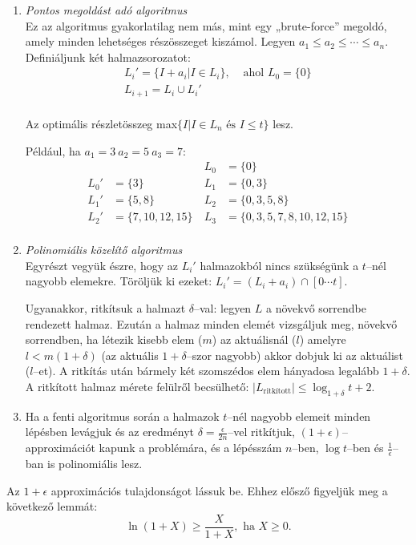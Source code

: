 \begin{enumerate}
  \item \emph{Pontos megoldást adó algoritmus}\\
Ez az algoritmus gyakorlatilag nem más, mint egy „brute-force” megoldó, amely
minden lehetséges részösszeget kiszámol. Legyen $a_1 \leq a_2 \leq \cdots \leq
a_n$. Definiáljunk két halmazsorozatot:
\begin{align*}
L_i' = \{ I + a_i | I \in L_i\}, & \mbox{ ahol } L_0 = \{ 0\} \\
L_{i+1}=L_i \cup L_i' & \\
\end{align*} 

Az optimális részletösszeg max$\{I|I \in L_n \mbox{ és } I \leq t\}$ lesz.

Például, ha $a_1=3~a_2=5~a_3=7$:
{ 
\begin{align*}
    &&~L_0 &= \{ 0 \} \\
L_0'&= \{ 3 \} &~ L_1 &= \{ 0, 3\} \\
L_1'&= \{ 5,8 \} &~ L_2 &= \{ 0, 3, 5, 8\} \\
L_2'&= \{ 7, 10, 12, 15 \} &~ L_3 &= \{ 0, 3, 5, 7, 8, 10, 12, 15\} \\
\end{align*}}  
  \item \emph{Polinomiális közelítő algoritmus} \\
  Egyrészt vegyük észre, hogy az $L_i'$ halmazokból nincs szükségünk a $t$--nél
  nagyobb elemekre. Töröljük ki ezeket: $L_i' = (L_i+a_i) \cap [0 \cdots t]$.
  
  Ugyanakkor, ritkítsuk a halmazt $\delta$--val: legyen $L$ a növekvő sorrendbe
  rendezett halmaz. Ezután a halmaz minden elemét vizsgáljuk meg, növekvő
  sorrendben, ha létezik kisebb elem ($m$) az aktuálisnál ($l$) amelyre
  $l<m(1+\delta)$ (az aktuális $1+\delta$--szor nagyobb) akkor dobjuk ki az
  aktuálist ($l$--et). A ritkítás után bármely két szomszédos elem hányadosa
  legalább $1+\delta$. A ritkított halmaz mérete felülről becsülhető:
  $|L_{\mbox{ritkított}}| \leq \log_{1+\delta}{t+2}$.
  \item Ha a fenti algoritmus során a halmazok $t$--nél nagyobb elemeit minden
  lépésben levágjuk és az eredményt $\delta = \frac{\epsilon}{2n}$--vel
  ritkítjuk, $(1+\epsilon)$--approximációt kapunk a problémára, és a lépésszám
  $n$--ben, $\log t$--ben és $\frac{1}{\epsilon}$--ban is polinomiális lesz.
\end{enumerate}

Az $1+\epsilon$ approximációs tulajdonságot lássuk be. Ehhez elősző figyeljük
meg a következő lemmát:
\[ \ln{(1+X)} \geq \frac{X}{1+X}, \mbox{ ha } X \geq 0.\]


